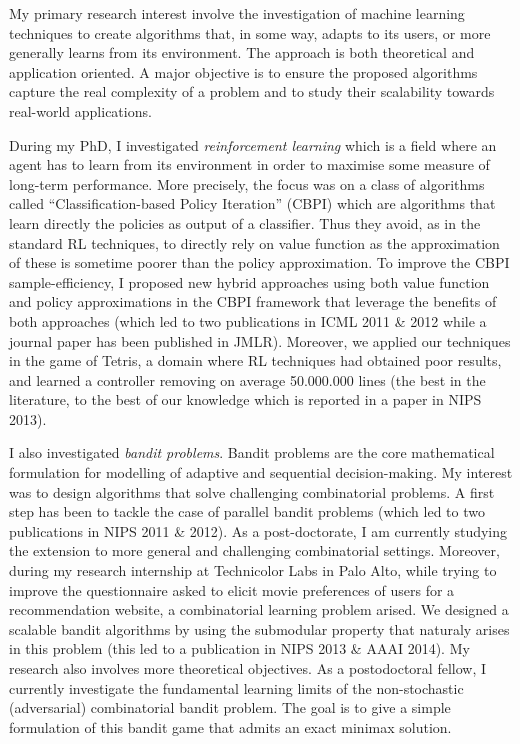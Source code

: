 My primary research interest involve the investigation of machine learning techniques to create algorithms that, in some way, adapts to its users, or more generally learns from its environment. The approach is both theoretical and application oriented. A major objective is to ensure the proposed algorithms capture the real complexity of a problem and to study  their scalability towards real-world applications. 

During my PhD, I investigated \textit{reinforcement learning}  which is a field where an agent has to learn from its environment in order to maximise some measure of long-term performance. More precisely, the focus was on a class of algorithms called ``Classification-based Policy Iteration'' (CBPI) which are algorithms that learn directly the policies as output of a classifier. Thus they avoid, as in the standard RL techniques, to directly rely on  value function as the approximation of these is sometime poorer than the policy approximation. To improve the CBPI sample-efficiency, I proposed new hybrid approaches using both value function and policy approximations in the CBPI framework that leverage the benefits of both approaches (which led to two publications in ICML 2011 \& 2012 while a journal paper has been published in JMLR). Moreover, we applied our techniques in the game of Tetris, a domain where RL techniques had obtained poor results, and learned a controller removing on average 50.000.000 lines (the best in the literature, to the best of our knowledge which is reported in a paper in NIPS 2013).

I also investigated \textit{bandit problems}. Bandit problems are the core mathematical formulation for modelling of adaptive and sequential decision-making. My interest was to design algorithms that solve challenging combinatorial problems. A first step has been to tackle the case of parallel bandit problems (which led to two publications in NIPS 2011 \& 2012). As a post-doctorate, I am currently studying the extension  to more general and challenging combinatorial settings. 
Moreover, during my research internship  at Technicolor Labs in Palo Alto, while trying to improve the questionnaire asked to elicit movie preferences of users for a recommendation website, a combinatorial learning problem arised. We designed a scalable bandit algorithms by using the submodular property that naturaly arises in this problem (this led to a publication in NIPS 2013 \& AAAI 2014). My research also involves more theoretical objectives. As a postodoctoral fellow,  I currently investigate the fundamental learning limits of the non-stochastic (adversarial) combinatorial bandit problem. The goal is to give a simple formulation of this bandit game that admits an exact minimax solution. 

